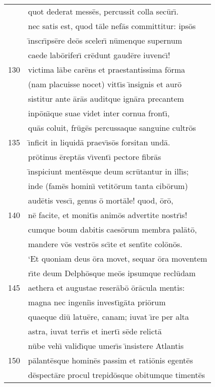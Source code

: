 \documentclass[paper=6in:9in,pagesize=pdftex,
               headinclude=on,footinclude=on,12pt]{scrbook}
\begin{document}
\begin{longtable}[p]{ r l }
 & quot dederat mess\=es, percussit colla sec\=ur\={\i}.\\ 
 & nec satis est, quod t\=ale nef\=as committitur: ips\=os\\ 
 & \={\i}nscr\={\i}ps\=ere de\=os sceler\={\i} n\=umenque supernum\\ 
 & caede lab\=orifer\={\i} cr\=edunt gaud\=ere iuvenc\={\i}!\\ 
130 & victima l\=abe car\=ens et praestantissima f\=orma\\ 
 & (nam placuisse nocet) vitt\={\i}s \={\i}nsignis et aur\=o\\ 
 & sistitur ante \=ar\=as auditque ign\=ara precantem\\ 
 & inp\=on\={\i}que suae videt inter cornua front\={\i},\\ 
 & qu\=as coluit, fr\=ug\=es percussaque sanguine cultr\=os\\ 
135 & \={\i}nficit in liquid\=a praev\={\i}s\=os forsitan und\=a.\\ 
 & pr\=otinus \=erept\=as v\={\i}vent\={\i} pectore fibr\=as\\ 
 & \={\i}nspiciunt ment\=esque deum scr\=utantur in ill\={\i}s;\\ 
 & inde (fam\=es homin\={\i} vetit\=orum tanta cib\=orum)\\ 
 & aud\=etis vesc\={\i}, genus \=o mort\=ale! quod, \=or\=o,\\ 
140 & n\=e facite, et monit\={\i}s anim\=os advertite nostr\={\i}s!\\ 
 & cumque boum dabitis caes\=orum membra pal\=at\=o,\\ 
 & mandere v\=os vestr\=os sc\={\i}te et sent\={\i}te col\=on\=os.\\ 
 & \indent `Et quoniam deus \=ora movet, sequar \=ora moventem\\ 
 & r\={\i}te deum Delph\=osque me\=os ipsumque recl\=udam\\ 
145 & aethera et augustae reser\=ab\=o \=or\=acula mentis:\\ 
 & magna nec ingeni\={\i}s invest\={\i}g\=ata pri\=orum\\ 
 & quaeque di\=u latu\=ere, canam; iuvat \={\i}re per alta\\ 
 & astra, iuvat terr\={\i}s et inert\={\i} s\=ede relict\=a\\ 
 & n\=ube veh\={\i} valid\={\i}que umer\={\i}s \={\i}nsistere Atlantis\\ 
150 & p\=alant\=esque homin\=es passim et rati\=onis egent\=es\\ 
 & d\=espect\=are procul trepid\=osque obitumque timent\=es\\ 

\end{longtable}
\end{document}
